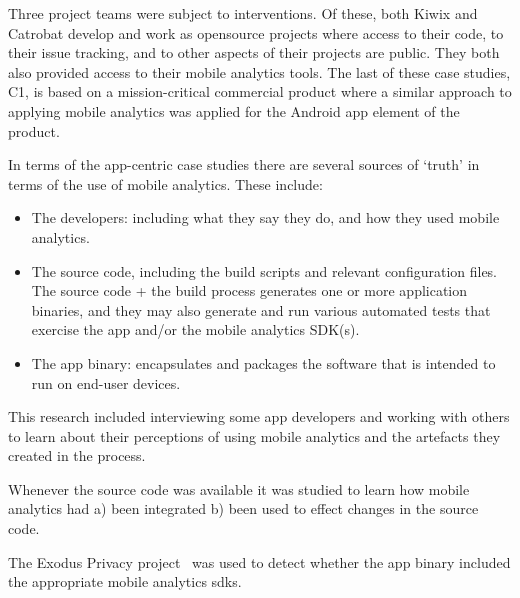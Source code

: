 Three project teams were subject to interventions. Of these, both Kiwix and Catrobat develop and work as opensource projects where access to their code, to their issue tracking, and to other aspects of their projects are public. They both also provided access to their mobile analytics tools. The last of these case studies, C1, is based on a mission-critical commercial product where a similar approach to applying mobile analytics was applied for the Android app element of the product.

In terms of the app-centric case studies there are several sources of `truth' in terms of the use of mobile analytics. These include:
\begin{itemize}
    \itemsep0em
    \item The developers: including what they say they do, and how they used mobile analytics.
    \item The source code, including the build scripts and relevant configuration files. The source code + the build process generates one or more application binaries, and they may also generate and run various automated tests that exercise the app and/or the mobile analytics SDK(s).
    \item The app binary: encapsulates and packages the software that is intended to run on end-user devices. 
\end{itemize}

This research included interviewing some app developers and working with others to learn about their perceptions of using mobile analytics and the artefacts they created in the process.

Whenever the source code was available it was studied to learn how mobile analytics had a) been integrated b) been used to effect changes in the source code. 

The Exodus Privacy project~ was used to detect whether the app binary included the appropriate mobile analytics \Glspl{sdk}.



